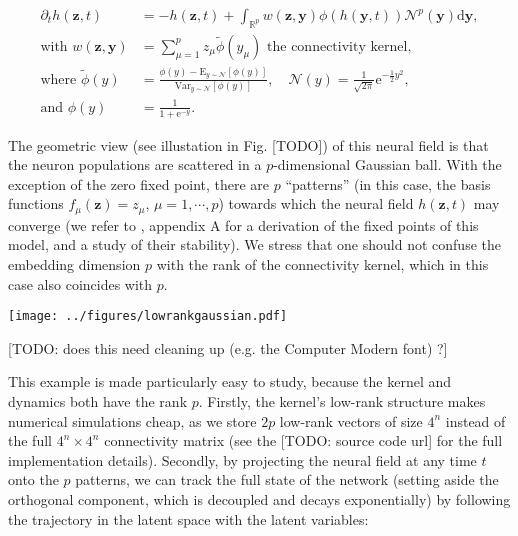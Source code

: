 \documentclass[10pt,letterpaper]{article}
\def\R{\mathbb R}
\def\Rp{\R^p}
\renewcommand{\vec}[1]{\boldsymbol{#1}}
\begin{document}
\begin{equation*} \begin{aligned}
\partial_t h(\vec z, t) &= -h(\vec z, t) + \int_{\Rp} w(\vec z, \vec y) \phi(h(\vec y, t)) \mathcal N^p(\vec y) \mathrm d \vec y, \\
\text{with } w(\vec z, \vec y) &= \sum_{\mu=1}^p z_\mu \tilde\phi(y_\mu) \text{ the connectivity kernel}, \\
\text{where } \tilde\phi(y) &= \frac{\phi(y) - \mathrm E_{y\sim\mathcal N}[\phi(y)]}{\mathrm{Var}_{y\sim\mathcal N}[\phi(y)]}, \quad \mathcal N(y) = \frac{1}{\sqrt{2\pi}} \mathrm{e}^{-\tfrac 12 y^2}, \\
\text{and } \phi(y) &= \frac{1}{1+\mathrm{e}^{-y}}.
\end{aligned} \end{equation*}

The geometric view (see illustation in Fig. [TODO]) of this neural field is that the neuron populations are scattered in a $p$-dimensional Gaussian ball. With the exception of the zero fixed point, there are $p$ ``patterns'' (in this case, the basis functions $f_\mu(\vec z) = z_\mu,\,\mu=1,\cdots,p$) towards which the neural field $h(\vec z,t)$ may converge (we refer to \cite{nvadot2023mathesis}, appendix A for a derivation of the fixed points of this model, and a study of their stability). We stress that one should not confuse the embedding dimension $p$ with the rank of the connectivity kernel, which in this case also coincides with $p$.

\texttt{[image: ../figures/lowrankgaussian.pdf]}

[TODO: does this need cleaning up (e.g. the Computer Modern font) ?]
\endif

This example is made particularly easy to study, because the kernel and dynamics both have the rank $p$. Firstly, the kernel's low-rank structure makes numerical simulations cheap, as we store $2p$ low-rank vectors of size $4^n$ instead of the full $4^n \times 4^n$ connectivity matrix (see the [TODO: source code url] for the full implementation details). Secondly, by projecting the neural field at any time $t$ onto the $p$ patterns, we can track the full state of the network (setting aside the orthogonal component, which is decoupled and decays exponentially) by following the trajectory in the latent space with the latent variables:
\end{document}
